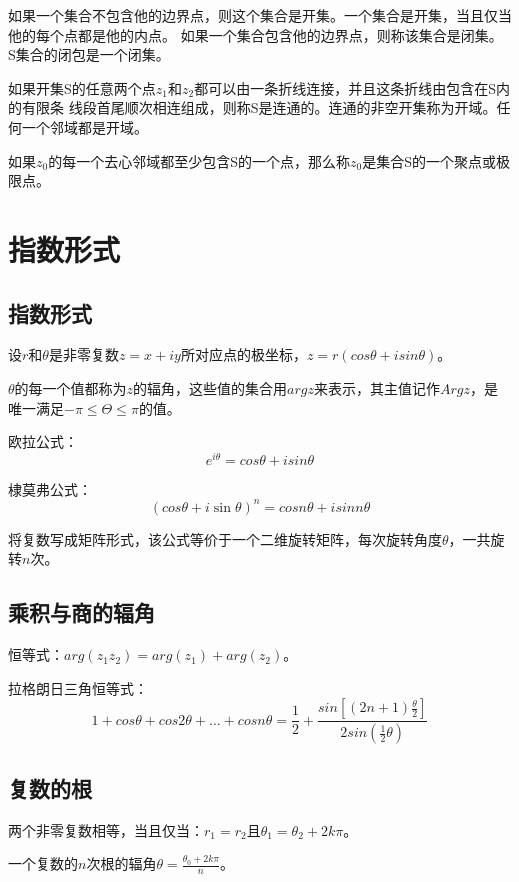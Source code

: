 \documentclass[UTF8]{article}
\begin{document}
            如果一个集合不包含他的边界点，则这个集合是开集。一个集合是开集，当且仅当他的每个点都是他的内点。
            如果一个集合包含他的边界点，则称该集合是闭集。
            S集合的闭包是一个闭集。

            如果开集S的任意两个点$z_1$和$z_2$都可以由一条折线连接，并且这条折线由包含在S内的有限条
            线段首尾顺次相连组成，则称S是连通的。连通的非空开集称为开域。任何一个邻域都是开域。

            如果$z_0$的每一个去心邻域都至少包含S的一个点，那么称$z_0$是集合S的一个聚点或极限点。
    \section{指数形式}
        \subsection{指数形式}
            设$r$和$\theta$是非零复数$z = x + iy$所对应点的极坐标，$z = r(cos\theta + isin\theta)$。

            $\theta$的每一个值都称为$z$的辐角，这些值的集合用$argz$来表示，其主值记作$Argz$，是唯一满足$-\pi \leq \Theta \leq \pi$的值。

            欧拉公式：
            $$e^{i\theta} = cos\theta + isin\theta$$

            棣莫弗公式：
            $$(cos\theta + i\sin\theta)^n = cosn\theta + isinn\theta$$

            将复数写成矩阵形式，该公式等价于一个二维旋转矩阵，每次旋转角度$\theta$，一共旋转$n$次。
        \subsection{乘积与商的辐角}
            恒等式：$arg(z_1z_2) = arg(z_1) + arg(z_2)$。

            拉格朗日三角恒等式：
            $$1 + cos\theta + cos2\theta + \dots + cosn\theta = \frac{1}{2} + \frac{sin[(2n + 1)\frac{\theta}{2}]}{2sin(\frac{1}{2}\theta)}$$
        \subsection{复数的根}
            两个非零复数相等，当且仅当：$r_1 = r_2$且$\theta_1 = \theta_2 + 2k\pi$。

            一个复数的$n$次根的辐角$\theta = \frac{\theta_0 + 2k\pi}{n}$。
\end{document}
